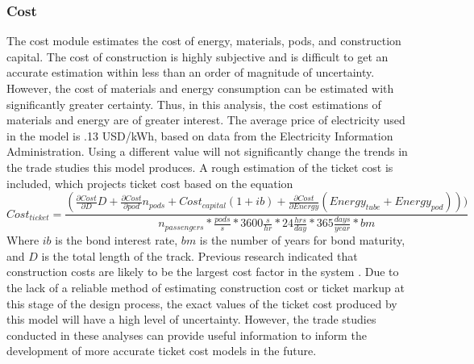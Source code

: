 \subsubsection{Cost}
	The cost module estimates the cost of energy, materials, pods, and
	construction capital. The cost of construction is highly subjective and is
	difficult to get an accurate estimation within less than an order of
	magnitude of uncertainty. However, the cost of materials and energy
	consumption can be estimated with significantly greater certainty.
	Thus, in this analysis, the cost estimations of materials and energy are of greater interest.
	The average price of electricity used in the model is .13 USD/kWh, based on
	data from the Electricity Information Administration\cite{EIA}.
	Using a different value will not significantly change the trends in the trade studies this model produces.
	A rough estimation of the ticket cost is included, which projects ticket cost based on the equation
	\begin{equation}
		\label{eq:ticket_cost}
		Cost_{ticket} = \frac{ (\frac{\partial Cost}{\partial D}D+\frac{\partial Cost }{\partial pod}n_{pods}+Cost_{capital} ( 1+ib ) + \frac{\partial Cost}{\partial Energy} (Energy_{tube} + Energy_{pod}  ))  )}{n_{passengers}*\frac{pods}{s}*3600\frac{s}{hr}*24\frac{hrs}{day}*365\frac{days}{year}*bm}
	\end{equation}
	Where $ib$ is the bond interest rate, $bm$ is the number of years for bond
	maturity, and $D$ is the total length of the track. Previous research
	indicated that construction costs are likely to be the largest cost factor
	in the system \cite{Musk}. Due to the lack of a reliable method of
	estimating construction cost or ticket markup at this stage of the design process,
	the exact values of the ticket cost produced by this model will have a high level of uncertainty.
	However, the trade studies conducted in these analyses can provide useful
	information to inform the development of more accurate ticket cost models in the future.